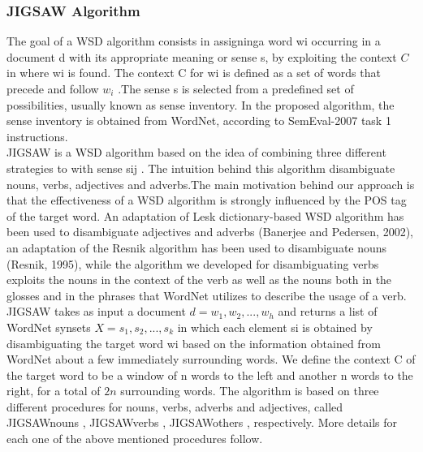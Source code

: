 \subsubsection{JIGSAW Algorithm\citep{disambiguation}}
\label{jigsawSec}
The goal of a WSD algorithm consists in assigninga word wi occurring in a document d with its appropriate meaning or sense s, by exploiting the context $C$ in where wi is found. The context C for wi is defined as a set of words that precede and follow $w_i$ .The sense s is selected from a predefined set of possibilities, usually known as sense inventory. In the proposed algorithm, the sense inventory is obtained from WordNet, according to SemEval-2007 task 1 instructions. \\
JIGSAW is a WSD algorithm based on the idea of combining three different strategies to with sense sij . The intuition behind this algorithm disambiguate nouns, verbs, adjectives and adverbs.The main motivation behind our approach is that the effectiveness of a WSD algorithm is strongly influenced by the POS tag of the target word. An adaptation of Lesk dictionary-based WSD algorithm has been used to disambiguate adjectives and adverbs (Banerjee and Pedersen, 2002), an adaptation of the Resnik algorithm has been used to disambiguate nouns (Resnik, 1995), while the algorithm we developed for disambiguating verbs exploits the nouns in the context of the verb as well as the nouns both in the glosses and in the phrases that WordNet utilizes to describe the usage of a verb. \\
JIGSAW takes as input a document $d = {w_1 , w_2 , . . . , w_h }$ and returns a list of WordNet synsets $X = {s_1 , s_2 , . . . ,s_k }$ in which each element si is obtained by disambiguating the target word wi based on the information obtained from WordNet about a few immediately surrounding words. We define the context C of the target word to be a window of n words to the left and another n words to the right, for a total of $2n$ surrounding words. The algorithm is based on three different procedures for nouns, verbs, adverbs and adjectives, called JIGSAWnouns , JIGSAWverbs , JIGSAWothers , respectively. More details for each one of the above mentioned procedures follow.


